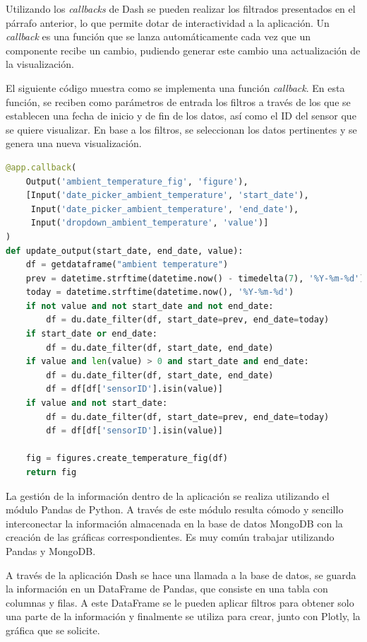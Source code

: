 \documentclass[a4paper, 12pt, oneside]{book}
\begin{document}
Utilizando los \textit{callbacks} de Dash se pueden realizar los filtrados presentados en el párrafo anterior, lo que permite dotar de interactividad a la aplicación. Un \textit{callback} es una función que se lanza automáticamente cada vez que un componente recibe un cambio, pudiendo generar este cambio una actualización de la visualización.


El siguiente código muestra como se implementa una función \textit{callback}. En esta función, se reciben como parámetros de entrada los filtros a través de los que se establecen una fecha de inicio y de fin de los datos, así como el ID del sensor que se quiere visualizar.  En base a los filtros, se seleccionan los datos pertinentes y se genera una nueva visualización.

\begin{lstlisting}[language=Python]
@app.callback(
    Output('ambient_temperature_fig', 'figure'),
    [Input('date_picker_ambient_temperature', 'start_date'),
     Input('date_picker_ambient_temperature', 'end_date'),
     Input('dropdown_ambient_temperature', 'value')]
)
def update_output(start_date, end_date, value):
    df = getdataframe("ambient temperature")
    prev = datetime.strftime(datetime.now() - timedelta(7), '%Y-%m-%d')
    today = datetime.strftime(datetime.now(), '%Y-%m-%d')
    if not value and not start_date and not end_date:
        df = du.date_filter(df, start_date=prev, end_date=today)
    if start_date or end_date:
        df = du.date_filter(df, start_date, end_date)
    if value and len(value) > 0 and start_date and end_date:
        df = du.date_filter(df, start_date, end_date)
        df = df[df['sensorID'].isin(value)]
    if value and not start_date:
        df = du.date_filter(df, start_date=prev, end_date=today)
        df = df[df['sensorID'].isin(value)]

    fig = figures.create_temperature_fig(df)
    return fig
\end{lstlisting}

La gestión de la información dentro de la aplicación se realiza utilizando el módulo Pandas de Python. A través de este módulo resulta cómodo y sencillo interconectar la información almacenada en la base de datos MongoDB con la creación de las gráficas correspondientes.
Es muy común trabajar utilizando Pandas y MongoDB. 

A través de la aplicación Dash se hace una llamada a la base de datos, se guarda la información en un DataFrame de Pandas, que  consiste en una tabla con columnas y filas. A este DataFrame se le pueden aplicar filtros para obtener solo una parte de la información y finalmente se utiliza para crear, junto con Plotly, la gráfica que se solicite.
\end{document}
